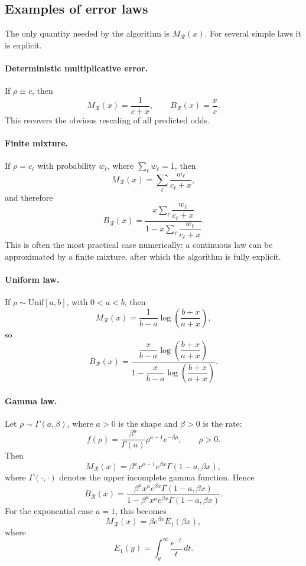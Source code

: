 \documentclass[11pt,a4paper]{article}
\begin{document}
\subsection{Examples of error laws}

The only quantity needed by the algorithm is $M_{\mathcal R}(x)$.  For several
simple laws it is explicit.

\paragraph{Deterministic multiplicative error.}
If $\rho\equiv c$, then
\[
  M_{\mathcal R}(x)=\frac1{c+x},
  \qquad
  B_{\mathcal R}(x)=\frac{x}{c}.
\]
This recovers the obvious rescaling of all predicted odds.

\paragraph{Finite mixture.}
If $\rho=c_\ell$ with probability $w_\ell$, where $\sum_\ell w_\ell=1$, then
\[
  M_{\mathcal R}(x)=\sum_\ell\frac{w_\ell}{c_\ell+x},
\]
and therefore
\[
  B_{\mathcal R}(x)
  =
  \frac{
    x\sum_\ell\dfrac{w_\ell}{c_\ell+x}
  }{
    1-x\sum_\ell\dfrac{w_\ell}{c_\ell+x}
  }.
\]
This is often the most practical case numerically: a continuous law can be
approximated by a finite mixture, after which the algorithm is fully explicit.

\paragraph{Uniform law.}
If $\rho\sim\mathrm{Unif}[a,b]$, with $0<a<b$, then
\[
  M_{\mathcal R}(x)
  =\frac1{b-a}\log\left(\frac{b+x}{a+x}\right),
\]
so
\[
  B_{\mathcal R}(x)
  =
  \frac{
    \dfrac{x}{b-a}\log\left(\dfrac{b+x}{a+x}\right)
  }{
    1-\dfrac{x}{b-a}\log\left(\dfrac{b+x}{a+x}\right)
  }.
\]

\paragraph{Gamma law.}
Let $\rho\sim\Gamma(a,\beta)$, where $a>0$ is the shape and $\beta>0$ is the rate:
\[
  f(\rho)=\frac{\beta^a}{\Gamma(a)}\rho^{a-1}e^{-\beta\rho},
  \qquad \rho>0.
\]
Then
\[
  \boxed{
  M_{\mathcal R}(x)
  =
  \beta^a x^{a-1}e^{\beta x}\Gamma(1-a,\beta x),
  }
  \tag{16}
\]
where $\Gamma(\cdot,\cdot)$ denotes the upper incomplete gamma function.  Hence
\[
  \boxed{
  B_{\mathcal R}(x)
  =
  \frac{
    \beta^a x^a e^{\beta x}\Gamma(1-a,\beta x)
  }{
    1-\beta^a x^a e^{\beta x}\Gamma(1-a,\beta x)
  }.
  }
  \tag{17}
\]
For the exponential case $a=1$, this becomes
\[
  M_{\mathcal R}(x)=\beta e^{\beta x}E_1(\beta x),
\]
where
\[
  E_1(y)=\int_y^\infty\frac{e^{-t}}{t}\,dt.
\]
\end{document}
